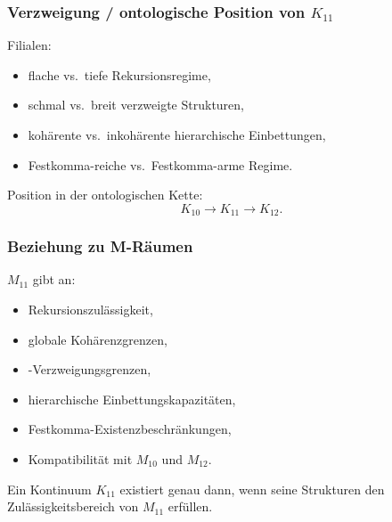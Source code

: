 \subsubsection{Verzweigung / ontologische Position von $K_{11}$}

Filialen:
\begin{itemize}
    \item flache vs.\ tiefe Rekursionsregime,
    \item schmal vs.\ breit verzweigte Strukturen,
    \item kohärente vs.\ inkohärente hierarchische Einbettungen,
    \item Festkomma-reiche vs.\ Festkomma-arme Regime.
\end{itemize}

Position in der ontologischen Kette:
\[
K_{10} \to K_{11} \to K_{12}.
\]

\subsubsection{Beziehung zu M-Räumen}

$M_{11}$ gibt an:
\begin{itemize}
    \item Rekursionszulässigkeit,
    \item globale Kohärenzgrenzen,
    \item-Verzweigungsgrenzen,
    \item hierarchische Einbettungskapazitäten,
    \item Festkomma-Existenzbeschränkungen,
    \item Kompatibilität mit $M_{10}$ und $M_{12}$.
\end{itemize}

Ein Kontinuum $K_{11}$ existiert genau dann, wenn seine Strukturen den Zulässigkeitsbereich von $M_{11}$ erfüllen.
